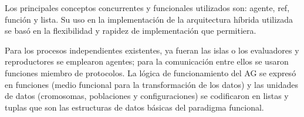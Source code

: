 Los principales conceptos concurrentes y funcionales utilizados son: agente, ref, función y lista. Su uso en la implementación de la arquitectura híbrida utilizada se basó en la flexibilidad y rapidez de implementación que permitiera. 

Para los procesos independientes existentes, ya fueran las islas o los evaluadores y reproductores se emplearon agentes; para la comunicación entre ellos se usaron funciones miembro de protocolos. La lógica de funcionamiento del AG se expresó en funciones (medio funcional para la transformación de los datos) y las unidades de datos (cromosomas, poblaciones y configuraciones) se codificaron en listas y tuplas que son las estructuras de datos básicas del paradigma funcional.



